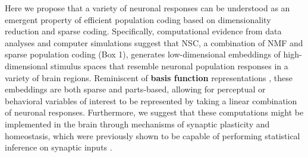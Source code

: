 Here we propose that a variety of neuronal responses
can be understood as an emergent property of efficient population coding
based on dimensionality reduction and sparse coding.
Specifically, computational evidence from data analyses and computer simulations
suggest that \ac{NSC},
a combination of \ac{NMF} \citep{PaateroTapper1994,LeeSeung1999}
and sparse population coding \citep{Field1994} (Box 1),
generates low-dimensional embeddings of 
high-dimensional stimulus spaces 
that resemble neuronal population responses 
in a variety of brain regions.
Reminiscent of \textbf{basis function} representations
\citep{PougetSejnowski1997,PougetSnyder2000,Poggio1990},
these embeddings are both sparse and parts-based,
allowing for perceptual or behavioral variables of interest
to be represented by taking a linear combination of neuronal responses.
Furthermore, we suggest that these computations might be implemented in the brain
through mechanisms of synaptic plasticity and homeostasis,
which were previously shown to be capable of
performing statistical inference on synaptic inputs
\citep{Nessler2009,Carlson2013,MorenoBoteDrugowitsch2015,Oja1982}.


